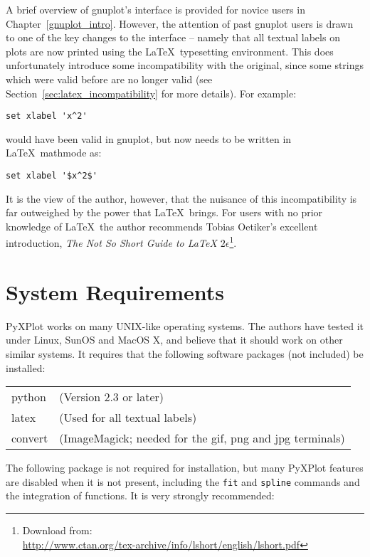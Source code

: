 \documentclass[a4paper,onecolumn,11pt]{book}
\begin{document}
A brief overview of gnuplot's interface is provided for novice users in
Chapter~\ref{gnuplot_intro}. However, the attention of past gnuplot users is
drawn to one of the key changes to the interface -- namely that all textual
labels on plots are now printed using the \LaTeX\ typesetting environment. This
does unfortunately introduce some incompatibility with the original, since some
strings which were valid before are no longer valid (see
Section~\ref{sec:latex_incompatibility} for more details). For example:

\begin{verbatim}set xlabel 'x^2'\end{verbatim}

\noindent would have been valid in gnuplot, but now needs to be written in
\LaTeX\ mathmode as:

\begin{verbatim}set xlabel '$x^2$'\end{verbatim}

\noindent It is the view of the author, however, that the nuisance of this
incompatibility is far outweighed by the power that \LaTeX\ brings. For users
with no prior knowledge of \LaTeX\ the author recommends Tobias Oetiker's
excellent introduction, \textit{The Not So Short Guide to \LaTeX
$2\epsilon$}\footnote{Download from:\\
\url{http://www.ctan.org/tex-archive/info/lshort/english/lshort.pdf}}.

\section{System Requirements}

PyXPlot works on many UNIX-like operating systems. The authors have tested it
under Linux, SunOS and MacOS X, and believe that it should work on other
similar systems. It requires that the following software packages (not
included) be installed:

\vspace{0.5cm}
\begin{tabular}{ll}
python  & (Version 2.3 or later) \\
latex   & (Used for all textual labels) \\
convert & (ImageMagick; needed for the gif, png and jpg terminals) \\
\end{tabular}
\vspace{0.5cm}

The following package is not required for installation, but many PyXPlot
features are disabled when it is not present, including the \texttt{fit} and
\texttt{spline} commands and the integration of functions. It is very strongly
recommended:
\end{document}
